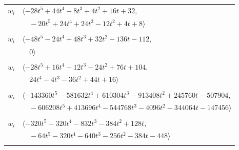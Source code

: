 \documentclass[11pt]{article}
\begin{document}
\begin{longtable}{@{}ll@{}}
$w_i$ & $\langle -28t^{5}+44t^{4}-8t^{3}+4t^{2}+16t+32,$\\
 & $\quad -20t^{5}+24t^{4}+24t^{3}-12t^{2}+4t+8\rangle$\\
\addlinespace[2pt]
\multicolumn{2}{@{}p{0.97\textwidth}@{}}{$i=34$, $D_i=8$, $\rho_{ij}$: $9{:}1, \allowbreak 17{:}2, \allowbreak 19{:}2, \allowbreak 23{:}1, \allowbreak 25{:}1, \allowbreak 30{:}2, \allowbreak 35{:}2, \allowbreak 40{:}2, \allowbreak 45{:}1, \allowbreak 50{:}1, \allowbreak 60{:}2, \allowbreak 69{:}2$}\\
$w_i$ & $\langle -48t^{5}-24t^{4}+48t^{3}+32t^{2}-136t-112,$\\
 & $\quad 0\rangle$\\
\addlinespace[2pt]
\multicolumn{2}{@{}p{0.97\textwidth}@{}}{$i=35$, $D_i=4$, $\rho_{ij}$: $2{:}2, \allowbreak 14{:}1, \allowbreak 16{:}1, \allowbreak 17{:}1, \allowbreak 18{:}1, \allowbreak 25{:}1, \allowbreak 34{:}1, \allowbreak 38{:}1, \allowbreak 41{:}1, \allowbreak 43{:}1, \allowbreak 53{:}1, \allowbreak 55{:}2, \allowbreak 67{:}1$}\\
$w_i$ & $\langle -28t^{5}+16t^{4}-12t^{3}-24t^{2}+76t+104,$\\
 & $\quad 24t^{4}-4t^{3}-36t^{2}+44t+16\rangle$\\
\addlinespace[2pt]
\multicolumn{2}{@{}p{0.97\textwidth}@{}}{$i=36$, $D_i=2048$, $\rho_{ij}$: $1{:}1, \allowbreak 5{:}1, \allowbreak 7{:}2, \allowbreak 9{:}1, \allowbreak 13{:}2, \allowbreak 19{:}1, \allowbreak 22{:}2, \allowbreak 23{:}2, \allowbreak 33{:}1, \allowbreak 43{:}1, \allowbreak 44{:}2, \allowbreak 54{:}1, \allowbreak 57{:}2, \allowbreak 66{:}2$}\\
$w_i$ & $\langle -143360t^{5}-581632t^{4}+610304t^{3}-913408t^{2}+245760t-507904,$\\
 & $\quad -606208t^{5}+413696t^{4}-544768t^{3}-4096t^{2}-344064t-147456\rangle$\\
\addlinespace[2pt]
\multicolumn{2}{@{}p{0.97\textwidth}@{}}{$i=37$, $D_i=64$, $\rho_{ij}$: $3{:}1, \allowbreak 5{:}2, \allowbreak 13{:}1, \allowbreak 22{:}2, \allowbreak 26{:}1, \allowbreak 40{:}2, \allowbreak 44{:}1, \allowbreak 47{:}1, \allowbreak 56{:}1, \allowbreak 61{:}1$}\\
$w_i$ & $\langle -320t^{5}-320t^{4}-832t^{3}-384t^{2}+128t,$\\
 & $\quad -64t^{5}-320t^{4}-640t^{3}-256t^{2}-384t-448\rangle$\\
\addlinespace[2pt]
\multicolumn{2}{@{}p{0.97\textwidth}@{}}{$i=38$, $D_i=512$, $\rho_{ij}$: $0{:}2, \allowbreak 2{:}1, \allowbreak 6{:}1, \allowbreak 16{:}1, \allowbreak 17{:}2, \allowbreak 21{:}2, \allowbreak 27{:}2, \allowbreak 35{:}2, \allowbreak 46{:}2, \allowbreak 56{:}1, \allowbreak 63{:}1$}\\

\end{longtable}
\end{document}
